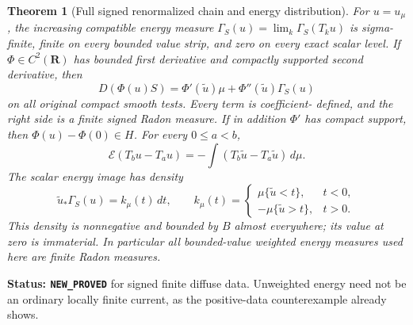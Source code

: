 \documentclass[11pt,a4paper]{article}
\numberwithin{equation}{section}
\newtheorem{theorem}{Theorem}[section]
\theoremstyle{definition}
\theoremstyle{remark}
\begin{document}
\begin{theorem}[Full signed renormalized chain and energy distribution]
\label{thm:r11-signed-renormalized-chain}
For $u=u_\mu$, the increasing compatible energy measure
$\Gamma_S(u)=\lim_k\Gamma_S(T_ku)$ is sigma-finite, finite
on every bounded value strip, and zero on every exact scalar
level.  If $\Phi\in C^2(\mathbf R)$ has bounded first derivative
and compactly supported second derivative, then
\[
 D(\Phi(u)S)=\Phi'(\widetilde u)\mu
                           +\Phi''(\widetilde u)\Gamma_S(u)
 \tag{SD7}
\]
on all original compact smooth tests.  Every term is coefficient-
defined, and the right side is a finite signed Radon measure.
If in addition $\Phi'$ has compact support, then
$\Phi(u)-\Phi(0)\in H$.
For every $0\le a<b$,
\[
 \mathcal E(T_bu-T_au)
                   =-\int(T_b\widetilde u-T_a\widetilde u)\,d\mu.
 \tag{SD8}
\]
The scalar energy image has density
\[
 \widetilde u_*\Gamma_S(u)=k_\mu(t)\,dt,\qquad
 k_\mu(t)=
 \begin{cases}
       \mu\{\widetilde u<t\},&t<0,\\
       -\mu\{\widetilde u>t\},&t>0.
 \end{cases}
 \tag{SD9}
\]
This density is nonnegative and bounded by $B$ almost everywhere;
its value at zero is immaterial.  In particular all bounded-value
weighted energy measures used here are finite Radon measures.
\end{theorem}

\noindent\textbf{Status: \texttt{NEW\_PROVED}} for signed
finite diffuse data.  Unweighted energy need not be an ordinary
locally finite current, as the positive-data counterexample already
shows.
\end{document}
